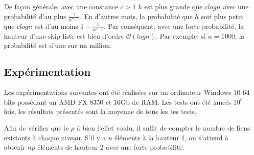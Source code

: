 \documentclass[hidelinks,a4paper, 12pt]{article}
\begin{document}
	 De façon générale, avec une constance $c>1$ $h$ est plus grande que $c log n$ avec une probabilité d'au plus $\frac{1}{n^{c-1}}$. En d'autres mots, la probabilité que $h$ soit plus petit que $c log n$ est d'au moins $1-\frac{1}{n^{c-1}}$. Par conséquent, avec une forte probabilité, la hauteur d'une skip-liste est bien d'ordre $\mathcal{O}(log n)$. Par exemple: si $n=1000$, la probabilité est d'une sur un million.
	
	
	\subsection{Expérimentation}
	
	Les expérimentations suivantes ont été réalisées sur un ordinateur Windows 10 64 bits possédant un AMD FX 8350 et 16Gb de RAM. Les tests ont été lancés $10^5$ fois, les résultats présentés sont la moyenne de tous les tes tests.
	\newline
	
	Afin de vérifier que le $p$ à bien l'effet voulu, il suffit de compter le nombre de liens existants à chaque niveau. S'il y a $n$ éléments à la hauteur 1, on s'attend à obtenir $np$ éléments de hauteur 2 avec une forte probabilité.
\end{document}

